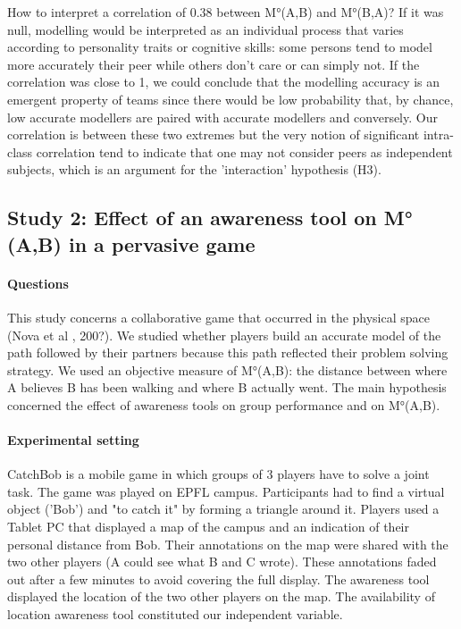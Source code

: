 \documentclass[twocolumn]{article}
\begin{document}
How to interpret a correlation of 0.38 between M°(A,B) and M°(B,A)? If it was
null, modelling would be interpreted as an individual process that varies
according to personality traits or cognitive skills: some persons tend to model
more accurately their peer while others don't care or can simply not. If the
correlation was close to 1, we could conclude that the modelling accuracy is an
emergent property of teams since there would be low probability that, by chance,
low accurate modellers are paired with accurate modellers and conversely. Our
correlation is between these two extremes but the very notion of significant
intra-class correlation tend to indicate that one may not consider peers as
independent subjects, which is an argument for the 'interaction' hypothesis
(H3). 

\subsection{Study 2: Effect of an awareness tool on M°(A,B)  in a pervasive
game}

\paragraph{Questions}

This study concerns a collaborative game that occurred in the physical space
(Nova et al , 200?). We studied whether players build an accurate model of the
path followed by their partners because this path reflected their problem
solving strategy. We used an objective measure of M°(A,B): the distance between
where A believes B has been walking and where B actually went. The main
hypothesis concerned the effect of awareness tools on group performance and on
M°(A,B). 

\paragraph{Experimental setting}

CatchBob is a mobile game in which groups of 3 players have to solve a joint
task. The game was played on EPFL campus. Participants had to find a virtual
object ('Bob') and "to catch it" by forming a triangle around it. Players used a
Tablet PC that displayed a map of the campus and an indication of their personal
distance from Bob. Their annotations on the map were shared with the two other
players (A could see what B and C wrote). These annotations faded out after a
few minutes to avoid covering the full display. The awareness tool displayed the
location of the two other players on the map. The availability of location
awareness tool constituted our independent variable.
\end{document}
